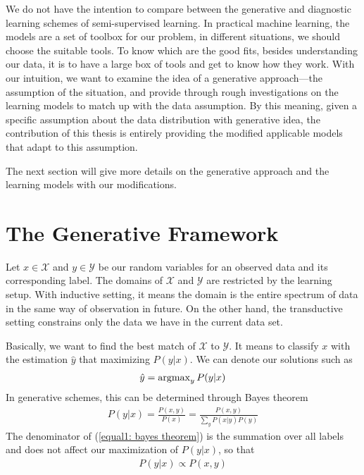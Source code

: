 We do not have the intention to compare between the generative and diagnostic learning schemes of semi-supervised learning. In practical machine learning, the models are a set of toolbox for our problem, in different situations, we should choose the suitable tools. To know which are the good fits, besides understanding our data, it is to have a large box of tools and get to know how they work. With our intuition, we want to examine the idea of a generative approach---the assumption of the situation, and provide through rough investigations on the learning models to match up with the data assumption. By this meaning, given a specific assumption about the data distribution with generative idea, the contribution of this thesis is entirely providing the modified applicable models that adapt to this assumption.

The next section will give more details on the generative approach and the learning models with our modifications.

\section{The Generative Framework}
Let $x \in \mathcal{X}$ and $y \in \mathcal{Y}$ be our random variables for an observed data and its corresponding label. The domains of $\mathcal{X}$ and $\mathcal{Y}$ are restricted by the learning setup. With inductive setting, it means the domain is the entire spectrum of data in the same way of observation in future. On the other hand, the transductive setting constrains only the data we have in the current data set.

Basically, we want to find the best match of $\mathcal{X}$ to $\mathcal{Y}$. It means to classify $x$ with the estimation $\hat{y}$ that maximizing $P(y | x)$. We can denote our solutions such as
\begin{align}
	\hat{y}=\operatorname{argmax}_y{P(y | x)}
\end{align}
In generative schemes, this can be determined through Bayes theorem
\begin{align}
	\label{equal1: bayes theorem}
	P(y | x)=\frac{P(x, y)}{P(x)} = \frac{P(x, y)}{\sum_{y}{P(x | y)P(y)}}
\end{align}
The denominator of (\ref{equal1: bayes theorem}) is the summation over all labels and does not affect our maximization of $P(y | x)$, so that
\begin{align}
	P(y | x) \propto P(x, y)
\end{align}


